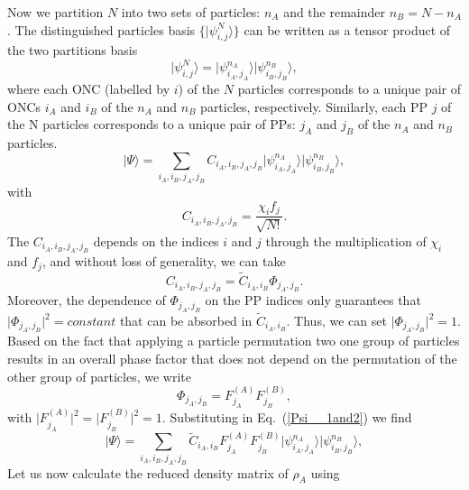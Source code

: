 Now we partition $N$ into two sets of particles: $n_A$ and the remainder 
$n_B=N-n_A$.  The distinguished particles basis $\{\vert \psi^N_{i,j}\rangle\}$
can be written as a tensor product of the two partitions basis 
%
\begin{equation}
\vert \psi^N_{i,j}\rangle=\vert \psi^{n_A}_{i_A,j_A}\rangle\vert \psi^{n_B}_{i_B,j_B}\rangle
\label{psiN_psin1n2},
\end{equation}
%
where each ONC (labelled by $i$) of the $N$ particles corresponds to a unique pair of ONCs
$i_A$ and $i_B$ of the $n_A$ and $n_B$ particles, respectively. Similarly, each
PP $j$ of the N particles corresponds to a unique pair of PPs:  $j_A$ and $j_B$
of the $n_A$ and $n_B$ particles.
%
\begin{equation}
\vert \Psi\rangle=\sum_{i_A,i_B,j_A,j_B}C_{i_A,i_B,j_A,j_B}\vert \psi^{n_A}_{i_A,j_A}\rangle\vert \psi^{n_B}_{i_B,j_B}\rangle
\label{Psi__1and2},
\end{equation}
with
%
\begin{equation}
C_{i_A,i_B,j_A,j_B}=\frac{\chi_if_j}{\sqrt{N!}}
\label{Ci1i2j1j2}.
\end{equation}
%
The  $C_{i_A,i_B,j_A,j_B}$ depends on the indices $i$ and $j$ through the
multiplication of $\chi_i$ and $f_j$, and without loss of generality, we can 
take
%
\begin{equation}
C_{i_A,i_B,j_A,j_B}=\tilde C_{i_A,i_B}\Phi_{j_A,j_B}
\label{Ci1i2Phij1j2}.
\end{equation}
%
Moreover, the dependence of $\Phi_{j_A,j_B}$ on the PP indices only guarantees that
$\vert \Phi_{j_A,j_B}\vert ^2=constant$ that can be absorbed in $\tilde
C_{i_A,i_B}$. Thus, we can set $\vert \Phi_{j_A,j_B}\vert ^2=1$. Based on the
fact that applying a particle permutation two one group of particles results in an
overall phase factor that does not depend on the permutation of the other group
of particles, we write
%
\begin{equation}
\Phi_{j_A,j_B}=F^{(A)}_{j_A}F^{(B)}_{j_B}
\label{Phij1j2F1F2},
\end{equation}
%
with $\vert F^{(A)}_{j_A}\vert ^2=\vert F^{(B)}_{j_B}\vert ^2=1$. Substituting
in Eq.~(\ref{Psi__1and2}) we find
%
\begin{equation}
\vert \Psi\rangle=\sum_{i_A,i_B,j_A,j_B}\tilde C_{i_A,i_B}F^{(A)}_{j_A}F^{(B)}_{j_B}\vert \psi^{n_A}_{i_A,j_A}\rangle\vert \psi^{n_B}_{i_B,j_B}\rangle
\label{Psi__1and2r},
\end{equation}
%
Let us now calculate the reduced density matrix of $\rho_A$ using   
%
